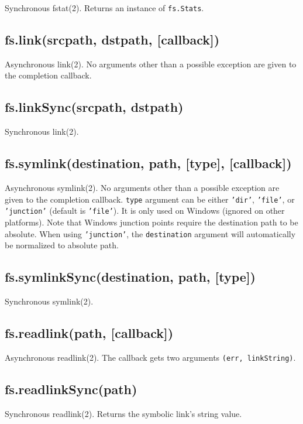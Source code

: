 Synchronous fstat(2). Returns an instance of \texttt{fs.Stats}.

\subsection{fs.link(srcpath, dstpath, {[}callback{]})}

Asynchronous link(2). No arguments other than a possible exception are
given to the completion callback.

\subsection{fs.linkSync(srcpath, dstpath)}

Synchronous link(2).

\subsection{fs.symlink(destination, path, {[}type{]}, {[}callback{]})}

Asynchronous symlink(2). No arguments other than a possible exception
are given to the completion callback. \texttt{type} argument can be
either \texttt{'dir'}, \texttt{'file'}, or \texttt{'junction'} (default
is \texttt{'file'}). It is only used on Windows (ignored on other
platforms). Note that Windows junction points require the destination
path to be absolute. When using \texttt{'junction'}, the
\texttt{destination} argument will automatically be normalized to
absolute path.

\subsection{fs.symlinkSync(destination, path, {[}type{]})}

Synchronous symlink(2).

\subsection{fs.readlink(path, {[}callback{]})}

Asynchronous readlink(2). The callback gets two arguments
\texttt{(err, linkString)}.

\subsection{fs.readlinkSync(path)}

Synchronous readlink(2). Returns the symbolic link's string value.

